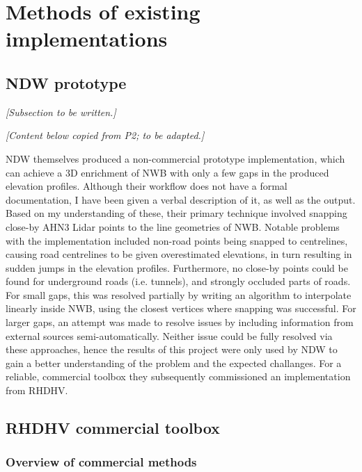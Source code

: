 \section{Methods of existing implementations}
\label{sec:methodsexisting}

\subsection{NDW prototype}
\label{sub:ndwprototype}

\textit{[Subsection to be written.]}

\textit{[Content below copied from P2; to be adapted.]}

NDW themselves produced a non-commercial prototype implementation, which can achieve a 3D enrichment of NWB with only a few gaps in the produced elevation profiles. Although their workflow does not have a formal documentation, I have been given a verbal description of it, as well as the output. Based on my understanding of these, their primary technique involved snapping close-by AHN3 Lidar points to the line geometries of NWB. Notable problems with the implementation included non-road points being snapped to centrelines, causing road centrelines to be given overestimated elevations, in turn resulting in sudden jumps in the elevation profiles. Furthermore, no close-by points could be found for underground roads (i.e. tunnels), and strongly occluded parts of roads. For small gaps, this was resolved partially by writing an algorithm to interpolate linearly inside NWB, using the closest vertices where snapping was successful. For larger gaps, an attempt was made to resolve issues by including information from external sources semi-automatically. Neither issue could be fully resolved via these approaches, hence the results of this project were only used by NDW to gain a better understanding of the problem and the expected challanges. For a reliable, commercial toolbox they subsequently commissioned an implementation from RHDHV.

\subsection{RHDHV commercial toolbox}
\label{sub:commercialproduct}

\subsubsection{Overview of commercial methods}

